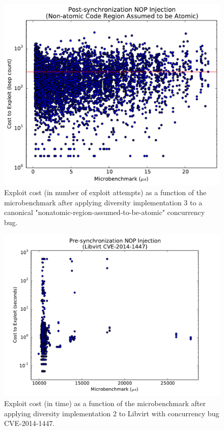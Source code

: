 \begin{figure}
	\centering
	\includegraphics[width=\columnwidth]{figures/nonatomic-post}
	\caption{Exploit cost (in number of exploit attempts) as a function of the microbenchmark after applying diversity implementation 3 to a canonical "nonatomic-region-assumed-to-be-atomic" concurrency bug.}
	\label{fig_nonatomic-post}
\end{figure}







\begin{figure}
	\centering
	\includegraphics[width=\columnwidth]{figures/libvirt-pre}
\caption{Exploit cost (in time) as a function of the microbenchmark after applying diversity implementation 2 to Libvirt with concurrency bug CVE-2014-1447.}
	\label{fig_libvirt-pre}
\end{figure}


